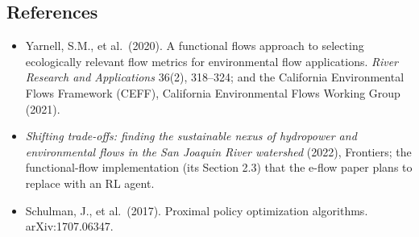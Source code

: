 \documentclass[11pt]{article}
\begin{document}
\subsection*{References}
\begin{itemize}
\item Yarnell, S.M., et al.\ (2020). A functional flows approach to selecting
  ecologically relevant flow metrics for environmental flow applications.
  \emph{River Research and Applications} 36(2), 318--324; and the California
  Environmental Flows Framework (CEFF), California Environmental Flows
  Working Group (2021).
\item \emph{Shifting trade-offs: finding the sustainable nexus of hydropower
  and environmental flows in the San Joaquin River watershed} (2022),
  Frontiers; the functional-flow implementation (its Section 2.3) that the
  e-flow paper plans to replace with an RL agent.
\item Schulman, J., et al.\ (2017). Proximal policy optimization algorithms.
  arXiv:1707.06347.
\end{itemize}
\end{document}
